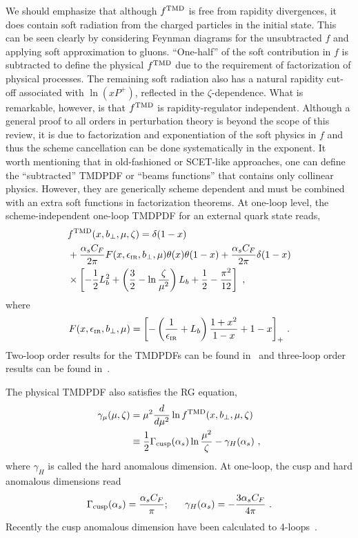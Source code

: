 \documentclass[aps,rmp,reprint,amsmath,amssymb,graphicx,longbibliography]{revtex4-1} %
\begin{document}
We should emphasize that although $f^{\rm TMD}$ is free from rapidity divergences, it does contain soft radiation from the
charged particles in the initial state. This can be seen clearly by considering Feynman diagrams for the unsubtracted $f$
and applying soft approximation to gluons. ``One-half'' of the soft contribution in $f$
is subtracted to define the physical $f^{\rm TMD}$ due to the requirement of factorization of
physical processes. The remaining soft radiation also has a natural rapidity cut-off
associated with $\ln(xP^+)$, reflected in the $\zeta$-dependence. What is remarkable,
however, is that $f^{\rm TMD}$ is rapidity-regulator independent. Although a general proof to all
orders in perturbation theory is beyond the scope of this review, it is due to
factorization and exponentiation of the soft physics in $f$ and thus the scheme cancellation
can be done systematically in the exponent. It worth mentioning that in old-fashioned or SCET-like approaches, one can define the ``subtracted'' TMDPDF or ``beams functions'' that contains only collinear physics. However, they are generically scheme dependent and must be combined with an extra soft functions in factorization theorems. At one-loop level, the scheme-independent one-loop TMDPDF for an external quark state reads,
\begin{align}\label{eq:ftmd_1loop}
	&f^{\rm TMD}(x,b_\perp,\mu,\zeta) = \delta(1-x)\nonumber \\
	&+\frac{\alpha_sC_F}{2\pi}F(x,\epsilon_{\tiny\mbox{IR}},b_\perp,\mu)\theta(x)\theta(1-x)+\frac{\alpha_sC_F}{2\pi}\delta(1-x)\nonumber \\
	&\times \left[-\frac{1}{2}L_b^2+\left(\frac{3}{2}-\ln \frac{\zeta}{\mu^2}\right)L_b+\frac{1}{2}-\frac{\pi^2}{12}\right] \ ,
\end{align}
where
\begin{align}
	F(x,\epsilon_{\tiny\mbox{IR}},b_\perp,\mu)=\left[-\left(\frac{1}{\epsilon_{\tiny\mbox{IR}}}+L_b\right)\frac{1+x^2}{1-x}+1-x\right]_+\,.
\end{align}
Two-loop order results for the TMDPDFs can be found in~\cite{Catani:2011kr,Catani:2012qa,Gehrmann:2014yya,Luebbert:2016itl,Echevarria:2016scs,Luo:2019hmp} and three-loop order results can be found in~\cite{Luo:2019szz}.

The physical TMDPDF also satisfies the RG equation,
\begin{align}
	\gamma_\mu(\mu,\zeta)&=\mu^2\frac{d}{d\mu^2}\ln f^{\rm TMD}(x,b_\perp,\mu,\zeta) \nonumber \\
	&\equiv \frac{1}{2}\Gamma_{\rm cusp}(\alpha_s)\ln \frac{\mu^2}{\zeta}-\gamma_H(\alpha_s)  \ ,
\end{align}
where $\gamma_H$ is called the hard anomalous dimension. At one-loop, the cusp and hard anomalous dimensions read
\begin{align}\label{eq:ad_hard}
	\Gamma_{\rm cusp}(\alpha_s) =\frac{\alpha_s C_F}{\pi}; ~~~~~
	\gamma_H(\alpha_s) =-\frac{3\alpha_sC_F}{4\pi}  \ .
\end{align}
Recently the cusp anomalous dimension have been calculated to 4-loops~\cite{Henn:2019swt,vonManteuffel:2020vjv}.
\end{document}
